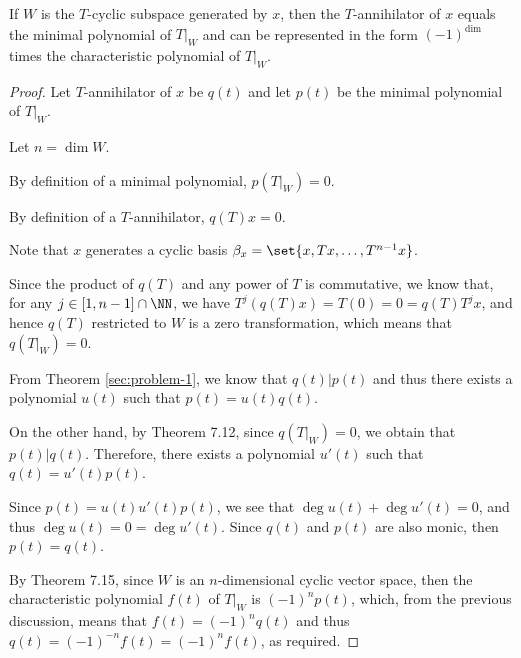 \documentclass[11pt]{scrartcl}
\begin{document}
\begin{theorem}
  If $W$ is the $T$-cyclic subspace generated by $x$, then the
  $T$-annihilator of $x$ equals the minimal polynomial of $T|_W$ and
  can be represented in the form $(-1)^{\dim}$ times the
  characteristic polynomial of $T|_W$.
\end{theorem}

\begin{proof}
  \hfill

  Let $T$-annihilator of $x$ be $q(t)$ and let $p(t)$ be the minimal
  polynomial of $T|_W$.

  Let $n = \dim W$.

  By definition of a minimal polynomial, $p(T|_W) = 0$.

  By definition of a $T$-annihilator, $q(T)x = 0$.

  Note that $x$ generates a cyclic basis
  $\beta_x = \set{x, Tx, \dots, T^{n-1}x}$.

  Since the product of $q(T)$ and any power of $T$ is commutative, we
  know that, for any $j\in[1, n - 1]\cap \NN$, we have
  $T^{j}(q(T)x) = T(0) = 0 = q(T)T^jx$, and hence $q(T)$ restricted to
  $W$ is a zero transformation, which means that $q(T|_W) = 0$.

  From Theorem \ref{sec:problem-1}, we know that $q(t) | p(t)$ and
  thus there exists a polynomial $u(t)$ such that $p(t) = u(t)q(t)$.

  On the other hand, by Theorem 7.12, since $q(T|_W) = 0$, we obtain
  that $p(t)|q(t)$. Therefore, there exists a polynomial $u'(t)$ such
  that $q(t)=u'(t)p(t)$.

  Since $p(t) = u(t)u'(t)p(t)$, we see that
  $\deg u(t) +\deg u'(t) = 0$, and thus $\deg u(t) = 0 = \deg
  u'(t)$. Since $q(t)$ and $p(t)$ are also monic, then $p(t) = q(t)$.

  By Theorem 7.15, since $W$ is an $n$-dimensional cyclic vector
  space, then the characteristic polynomial $f(t)$ of $T|_W$ is
  $(-1)^np(t)$, which, from the previous discussion, means that
  $f(t)= (-1)^nq(t)$ and thus $q(t) = (-1)^{-n}f(t) = (-1)^nf(t)$, as
  required.
  
\end{proof}
\end{document}
